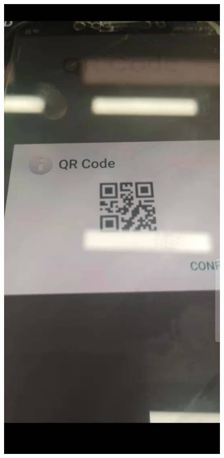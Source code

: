 \documentclass[12pt, a4paper]{article}
\theoremstyle{definition}
\begin{document}
\begin{figure}[htbp]
\begin{minipage}[t]{0.25\linewidth}
		\end{minipage}
		\begin{minipage}[t]{0.25\linewidth}
		\centering
		\includegraphics[width=\linewidth]{5-4.jpeg}

\end{minipage}
\end{figure}
\end{document}
